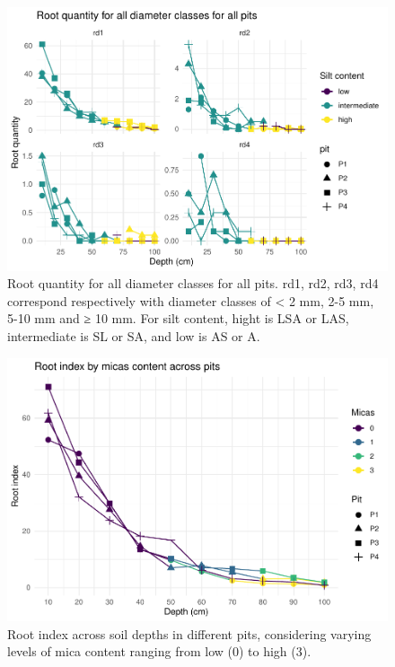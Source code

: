 \documentclass[fleqn,11pt]{latex/stylish_article} %
\begin{document}
\normalsize



\scriptsize

\begin{figure}

{\centering \includegraphics[width=0.8\linewidth]{pedoP16-report_files/figure-latex/pitPlotdiameterClassDistinct-1} 

}

\caption{Root quantity for all diameter classes for all pits. rd1, rd2, rd3, rd4 correspond respectively with diameter classes of \textless{} 2 mm, 2-5 mm, 5-10 mm and ≥ 10 mm. For silt content, hight is LSA or LAS, intermediate is SL or SA, and low is AS or A.}\label{fig:pitPlotdiameterClassDistinct}
\end{figure}

\normalsize



\scriptsize

\begin{figure}

{\centering \includegraphics[width=0.8\linewidth]{pedoP16-report_files/figure-latex/pitPlotrootIndexMicas-1} 

}

\caption{Root index across soil depths in different pits, considering varying levels of mica content ranging from low (0) to high (3).}\label{fig:pitPlotrootIndexMicas}
\end{figure}
\end{document}
